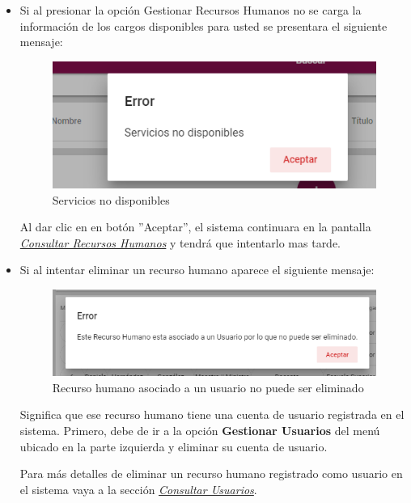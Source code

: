           \begin{itemize}
                \item Si al  presionar la opción Gestionar Recursos Humanos no se carga la información de los cargos disponibles para usted se presentara el siguiente mensaje:

             \begin{figure}[H]
                \centering
                \includegraphics[width=0.4\linewidth]{images/SP1/MSGSN}
                \caption{Servicios no disponibles}
                \label{SND}

            \end{figure}

                    Al dar clic en en botón ''Aceptar'', el sistema continuara en la pantalla  \hyperlink{consultarRH}{\textit{Consultar Recursos Humanos}} y tendrá que intentarlo  mas tarde.


              \item Si al intentar eliminar un recurso humano aparece el siguiente mensaje:
                \begin{figure}[H]
                   \centering
                   \includegraphics[width=0.4\linewidth]{images/SP1/MSG56}
                    \caption{Recurso humano asociado a un usuario no puede ser eliminado}
                   \label{mensaje56}
                \end{figure}

                Significa que ese recurso humano tiene una cuenta de usuario registrada en el sistema. Primero, debe de ir a la opción \textbf{Gestionar Usuarios} del menú ubicado en la parte izquierda y eliminar su cuenta de usuario.

                Para más detalles de eliminar un recurso humano registrado como usuario en el sistema vaya a la sección \hyperlink{consultarUs}{\textit{Consultar Usuarios}}.


           \end{itemize}

